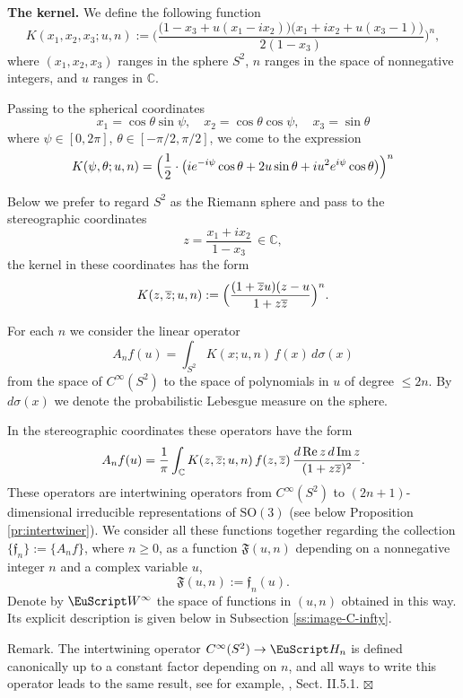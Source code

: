\documentclass[]{amsart}
\newcounter{sec}
\newcounter{punct}[sec]
\def\punct{\refstepcounter{punct}{\arabic{sec}.\arabic{punct}.  }}
\def\SO{\mathrm  {SO}}
\def\le{\leqslant}
\def\ge{\geqslant}
\renewcommand{\Re}{\mathop{\rm Re}\nolimits}
\renewcommand{\Im}{\mathop{\rm Im}\nolimits}
\def\cH{\EuScript H}
\def\cW{\EuScript W}
\def\frF{\mathfrak F}
\def\frf{\mathfrak f}
\def\C {{\mathbb C }}
\def\ov{\overline}
\def\sm{\smallskip}
\begin{document}
\sm

{\bf\punct The kernel.} 
We define the following function 
\begin{equation}
K(x_1,x_2,x_3; u, n):=
\biggl(\frac{\bigl(1-x_3+u(x_1-ix_2)\bigr)
\bigl(x_1+ix_2+u(x_3-1)\bigr)}{2(1-x_3)}\biggr)^n,
\label{eq:K-x}
\end{equation}
where $(x_1,x_2,x_3)$ ranges in the sphere $S^2$,
$n$ ranges in the space of nonnegative integers, and $u$ ranges in $\C$.

Passing to the spherical coordinates 
$$
x_1=\cos\theta\sin\psi,\quad x_2=\cos\theta \cos\psi,
\quad
x_3=\sin\theta
$$
where $\psi\in [0,2\pi]$, $\theta\in [-\pi/2,\pi/2]$,
we come to the expression
\begin{equation}
K(\psi,\theta;u,n)=
\Bigl(\frac 12\cdot \bigl(i e^{-i\psi}\cos\theta
+2u \sin \theta+ i u^2 e^{i\psi}\cos\theta
\bigr)
\Bigr)^n
\label{eq:K-phi}
\end{equation}

Below we prefer to regard $S^2$ as the Riemann sphere
and pass to the stereographic coordinates
$$
z=\frac{x_1+ix_2}{1-x_3}\,\in\C,
$$ 
the kernel in these coordinates has the form
$$
K(z, \ov z; u,n):=\Bigl(\frac{(1+\ov z u)(z-u}{1+z\ov z}\Bigr)^n
.$$

For each $n$ we consider the linear operator
$$
A_n f(u)=\int_{S^2} K(x; u,n) \,f(x)\,d\sigma(x)
$$
from the space of $C^\infty(S^2)$
to the space of polynomials in $u$ of degree
$\le 2n$. By $d\sigma(x)$ we denote the probabilistic
Lebesgue measure on the sphere. 

In the stereographic coordinates these operators have the form
$$
A_n f(u)=\frac 1\pi \int_\C K(z,\ov z;u,n)\, f(z,\ov z)\,\frac{d\Re z\,d\Im z}{(1+z\ov z)^2}.
$$
These operators are intertwining operators from $C^\infty(S^2)$
to $(2n+1)$-dimensional irreducible representations of $\SO(3)$
(see below Proposition \ref{pr:intertwiner}).
We consider all these functions together
regarding the collection $\{\frf_n\}:=\{A_n f\}$, where $n\ge 0$, as a function 
$\frF(u,n)$ depending
on a nonnegative integer $n$ and a complex variable $u$, 
$$
\frF(u,n):=\frf_n(u).
$$
Denote by $\cW^\infty$ the space of functions in $(u,n)$
obtained in this way. Its explicit description is given below
in Subsection \ref{ss:image-C-infty}.



\sm

{\sc Remark.} The intertwining operator $C^\infty(S^2)\to \cH_n$ is defined canonically up to a constant factor depending on $n$, and all ways to write 
this operator leads to the same
result, see for example, \cite{HTF2}, Sect. II.5.1.
\hfill $\boxtimes$
\end{document}
